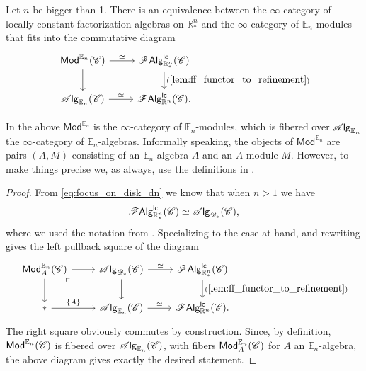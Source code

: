 \documentclass[../text.tex]{subfiles}
\begin{document}
\begin{theorem}\label{thm:classif_Rn*}
    Let $n$ be bigger than 1. There is an equivalence between the $\infty$-category of locally constant factorization algebras on $\mathbb{R}^n_*$ and the $\infty$-category of $\mathbb{E}_n$-modules that fits into the commutative diagram
    \begin{equation}
        \begin{tikzcd}
            \mathsf{Mod}^{\mathbb{E}_n} (\catC) \arrow[r, "\simeq"] \arrow[d] & \lcfa_{\mathbb{R}^n_*} (\catC) \arrow[d, "(\ref{lem:ff_functor_to_refinement})"] \\
            \alg{\mathbb{E}_n} (\catC) \arrow[r, "\simeq"] & \lcfa_{\mathbb{R}^n} (\catC).
        \end{tikzcd}
    \end{equation}
\end{theorem}

\begin{remark}
    In the above $\mathsf{Mod}^{\mathbb{E}_n}$ is the $\infty$-category of $\mathbb{E}_n$-modules, which is fibered over $\mathscr{A} \mathsf{lg}_{\mathbb{E}_n}$ the $\infty$-category of $\mathbb{E}_n$-algebras. Informally speaking, the objects of $\mathsf{Mod}^{\mathbb{E}_n}$ are pairs $(A, M)$ consisting of an $\mathbb{E}_n$-algebra $A$ and an $A$-module $M$. However, to make things precise we, as always, use the definitions in \cite[ch.3]{lurie_ha}.
\end{remark}


\begin{proof}
    From \cref{eq:focus_on_disk_dn} we know that when $n > 1$ we have
    \begin{equation}
        \mathscr{F} \mathsf{Alg}^{\mathsf{lc}}_{\mathbb{R}^n_*} (\mathscr{C}) \simeq \mathscr{A} \mathsf{lg}_{\mathscr{D}_*} (\mathscr{C}),
    \end{equation}
    where we used the notation from . Specializing  to the case at hand, and rewriting gives the left pullback square of the diagram
    \begin{equation}
        \begin{tikzcd}
            \mathsf{Mod}^{\mathbb{E}_n}_A (\catC) \arrow[dr, phantom, "\ulcorner", very near start] \arrow[r] \arrow[d] & \alg{\mathscr{D}_*} (\catC) \arrow[d] \arrow[r, "\simeq"] & \lcfa_{\mathbb{R}^n_*} (\catC) \arrow[d, "(\ref{lem:ff_functor_to_refinement})"] \\
            * \arrow[r, "\{A\}"] & \alg{\mathbb{E}_n} (\catC) \arrow[r, "\simeq"] & \lcfa_{\mathbb{R}^n} (\catC).
        \end{tikzcd}
    \end{equation}
    The right square obviously commutes by construction. Since, by definition, $\mathsf{Mod}^{\mathbb{E}_n} (\mathscr{C})$ is fibered over $\mathscr{A} \mathsf{lg}_{\mathbb{E}_n} (\mathscr{C})$, with fibers $\mathsf{Mod}^{\mathbb{E}_n}_A (\mathscr{C})$ for $A$ an $\mathbb{E}_n$-algebra, the above diagram gives exactly the desired statement.
\end{proof}
\end{document}
